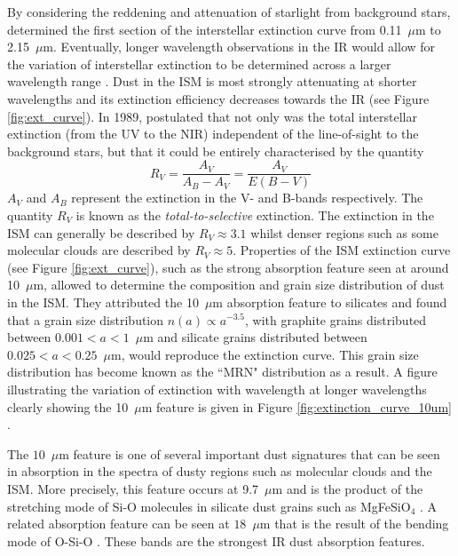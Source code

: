 By considering the reddening and attenuation of starlight from background stars,  \citet{Bless1972} determined the first section of the interstellar extinction curve from 0.11~$\mu$m to 2.15~$\mu$m.  Eventually, longer wavelength observations in the IR would allow for the variation of interstellar extinction to be determined across a larger  wavelength range \citep{Rieke1985}.  Dust in the ISM is most strongly attenuating at shorter wavelengths and its extinction efficiency decreases towards the IR (see Figure \ref{fig:ext_curve}).  In 1989, \citeauthor*{Cardelli1989} postulated that not only was the total interstellar extinction (from the UV to the NIR) independent of the line-of-sight to the background stars, but that it could be entirely characterised by the quantity
\begin{equation}
R_V=\frac{A_V}{A_B-A_V}=\frac{A_V}{E(B-V)}
\end{equation}
\noindent $A_V$ and $A_B$ represent the extinction in the V- and B-bands respectively. The quantity $R_V$ is known as the {\em total-to-selective} extinction.  The extinction in the ISM can generally be described by $R_V\approx3.1$ whilst denser regions such as some molecular clouds are described by $R_V\approx5$.  Properties of the ISM extinction curve (see Figure \ref{fig:ext_curve}), such as the strong absorption feature seen at around 10~$\mu$m, allowed \citet*{Mathis1977} to determine the composition and grain size distribution of dust in the ISM.  They attributed the 10~$\mu$m absorption feature to silicates and found that a grain size distribution $n(a) \propto a^{-3.5}$, with graphite grains distributed between $0.001<a<1$~$\mu$m and silicate grains distributed between $0.025<a<0.25$~$\mu$m, would reproduce the extinction curve.  This grain size distribution has become known as the ``MRN" distribution as a result.  A figure illustrating the variation of extinction with wavelength at longer wavelengths clearly showing the 10~$\mu$m feature is given in Figure \ref{fig:extinction_curve_10um} \citep{Weingartner2001,Draine2003}.  



The $10$~$\mu$m feature is one of several important  dust signatures that can be seen in absorption in the spectra of dusty regions such as molecular clouds and the ISM.  More precisely, this feature occurs at 9.7~$\mu$m and is the product of the stretching mode of Si-O molecules in silicate dust grains such as MgFeSiO$_4$ \citep{Draine2003}.  A related  absorption feature can be seen at $18$~$\mu$m that is the result of the bending mode of O-Si-O \citep{McCarthy1980}.  These bands are the strongest IR dust absorption features.

